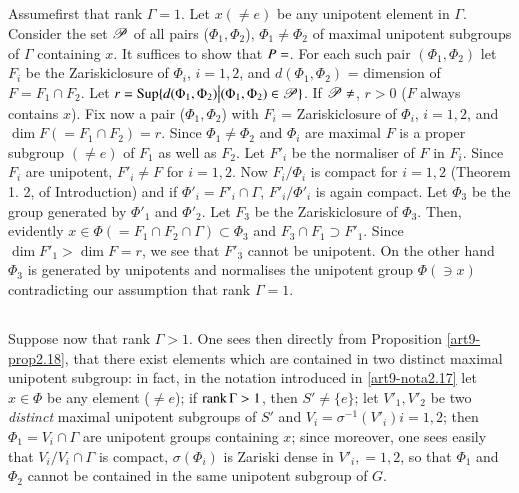 \subsection{}\label{art9-subsec3.2}
Assume\pageoriginale first that rank $\Gamma = 1$. Let $x (\neq e)$ be any unipotent element in $\Gamma$. Consider the set $\mathscr{P}$ of all pairs ($\Phi_1, \Phi_2$), $\Phi_1 \neq \Phi_2$ of maximal unipotent subgroups of $\Gamma$ containing $x$. It suffices to show that $P=\empty$. For each such pair $(\Phi_1, \Phi_2)$ let $F_i$ be the Zariskiclosure of $\Phi_i$, $i = 1, 2$, and $d (\Phi_1, \Phi_2)$ = dimension of $F = F_1 \cap F_2$. Let $r = \operatorname{Sup} \{d (\Phi_1,\Phi_2) \big| (\Phi_1, \Phi_2) \in \mathscr{P}\}$. If $\sP \neq \empty$, $r > 0$ ($F$ always contains $x$). Fix now a pair ($\Phi_1, \Phi_2$) with $F_i$ = Zariskiclosure of $\Phi_i$, $i = 1, 2$, and $\dim F (= F_1 \cap F_2) = r$. Since $\Phi_1 \neq \Phi_2$ and $\Phi_i$ are maximal $F$ is a proper subgroup $(\neq e)$ of $F_1$ as well as $F_2$. Let $F'_i$ be the normaliser of $F$ in $F_i$. Since $F_i$ are unipotent, $F'_i \neq F$ for $i = 1, 2$. Now $F_i / \Phi_i$ is compact for $i= 1, 2$ (\cf Theorem 1. 2, of Introduction) and if $\Phi'_i = F'_i \cap \Gamma$, $F'_i / \Phi'_i$ is again compact. Let $\Phi_3$ be the group generated by $\Phi'_1$ and $\Phi'_2$. Let $F_3$ be the Zariskiclosure of $\Phi_3$. Then, evidently $x \in \Phi (= F_1 \cap F_2 \cap \Gamma) \subset \Phi_3$ and $F_3 \cap F_1 \supset F'_1$. Since $\dim F'_1 > \dim F = r$, we see that $F'_3$ cannot be unipotent. On the other hand $\Phi_3$ is generated by unipotents  and normalises the unipotent group $\Phi (\ni x)$ contradicting our assumption that rank $\Gamma=1$.

\setcounter{subsection}{2}
\subsection{}\label{art9-subsec3.3}
Suppose now that rank $\Gamma >1$. One sees then directly from Proposition \ref{art9-prop2.18}, that there exist elements which are contained in two distinct maximal unipotent subgroup: in fact, in the notation introduced in \ref{art9-nota2.17} let $x \in \Phi$ be any element ($\neq e$); if $\operatorname{rank} \Gamma > 1$, then $S' \neq \{e\}$; let $V'_1, V'_2$ be two \textit{distinct} maximal unipotent subgroups of $S'$ and $V_i = \sigma^{-1} (V'_i) i = 1, 2$; then $\Phi_1 = V_i \cap \Gamma$ are unipotent groups containing $x$; since moreover, one sees easily that $V_i / V_i \cap \Gamma$ is compact, $\sigma (\Phi_i)$ is Zariski dense in $V'_i, = 1, 2$, so that $\Phi_1$ and $\Phi_2$ cannot be contained in the same unipotent subgroup of $G$.

